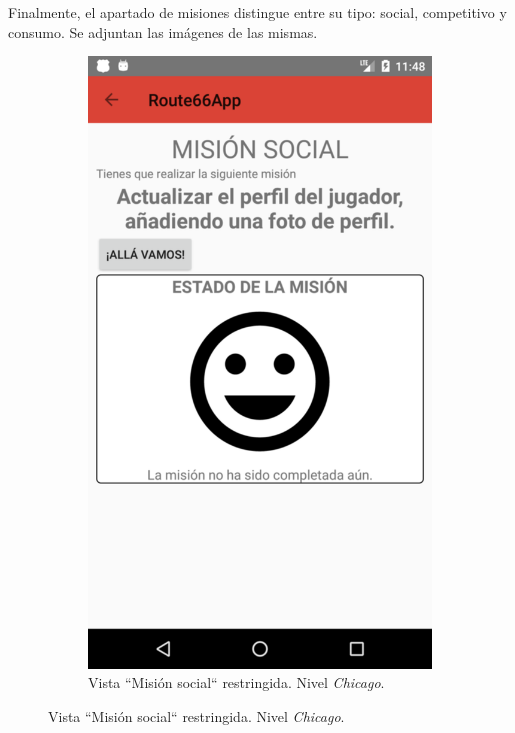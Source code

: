\documentclass[twoside]{report}
\begin{document}
Finalmente, el apartado de misiones distingue entre su tipo: social, competitivo y consumo. Se adjuntan las imágenes de las mismas.
\begin{figure}[H]
\begin{center}
	\begin{subfigure}[t]{.3\linewidth}
		\includegraphics[scale=0.2]{images/userguide/25.png}
		\caption{Vista “Misión social“ restringida. Nivel \textit{Chicago}.}
	\end{subfigure}\hspace{2mm}%

\end{center}
\end{figure}
\end{document}
